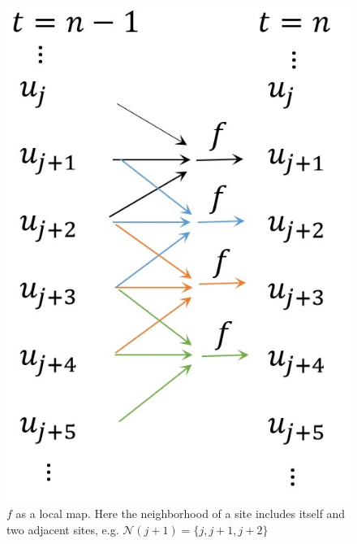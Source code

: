\documentclass[smallextended,natbib]{svjour3}       %
\begin{document}
\begin{figure}
\centerline{\includegraphics[scale=0.4]{chapterGP/figures/diagram}}
\caption[$f$ as a Local Map] {\label{fig:local map}$f$ as a local map. Here the neighborhood of a site includes itself and two adjacent sites, e.g. $\mathcal{N}(j+1)=\{ j,j+1,j+2 \}$}
\end{figure}
\end{document}
